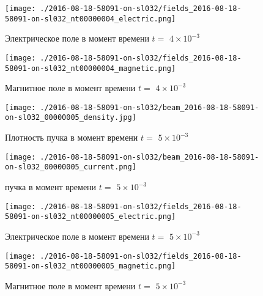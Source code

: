 \documentclass[a4paper,14pt]{extreport}
\begin{document}
\begin{center}
\begin{figure}[!hbt]
\texttt{[image: ./2016-08-18-58091-on-sl032/fields\_2016-08-18-58091-on-sl032\_nt00000004\_electric.png]}
\caption{\label{electric_4_18} Электрическое поле  в момент времени $t = $ $4\times 10^{-3}$ }
\end{figure}
\end{center}
\begin{center}
\begin{figure}[!hbt]
\texttt{[image: ./2016-08-18-58091-on-sl032/fields\_2016-08-18-58091-on-sl032\_nt00000004\_magnetic.png]}
\caption{\label{magnetic_4_19} Магнитное поле  в момент времени $t = $ $4\times 10^{-3}$ }
\end{figure}
\end{center}
\begin{center}
\begin{figure}[!hbt]
\texttt{[image: ./2016-08-18-58091-on-sl032/beam\_2016-08-18-58091-on-sl032\_00000005\_density.jpg]}
\caption{\label{density_beam5_20} Плотность пучка в момент времени $t = $ $5\times 10^{-3}$ }
\end{figure}
\end{center}
\begin{center}
\begin{figure}[!hbt]
\texttt{[image: ./2016-08-18-58091-on-sl032/beam\_2016-08-18-58091-on-sl032\_00000005\_current.png]}
\caption{\label{current_beam5_21}  пучка в момент времени $t = $ $5\times 10^{-3}$ }
\end{figure}
\end{center}
\begin{center}
\begin{figure}[!hbt]
\texttt{[image: ./2016-08-18-58091-on-sl032/fields\_2016-08-18-58091-on-sl032\_nt00000005\_electric.png]}
\caption{\label{electric_5_22} Электрическое поле  в момент времени $t = $ $5\times 10^{-3}$ }
\end{figure}
\end{center}
\begin{center}
\begin{figure}[!hbt]
\texttt{[image: ./2016-08-18-58091-on-sl032/fields\_2016-08-18-58091-on-sl032\_nt00000005\_magnetic.png]}
\caption{\label{magnetic_5_23} Магнитное поле  в момент времени $t = $ $5\times 10^{-3}$ }
\end{figure}
\end{center}
\end{document}
